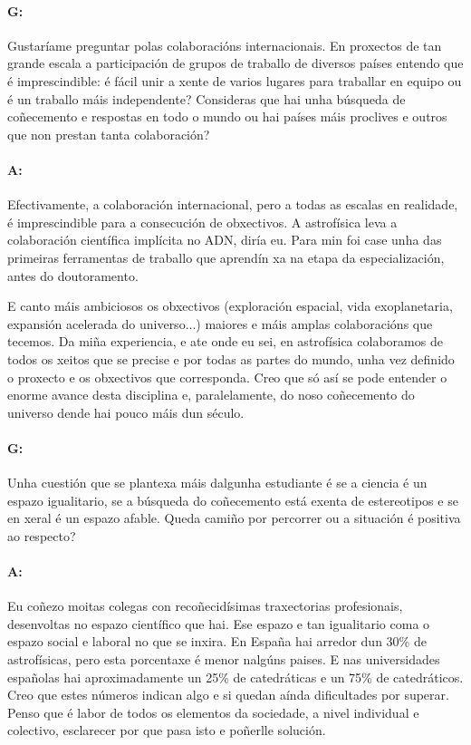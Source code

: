 \begin{refsection}
\begin{multicols}{2}
\paragraph{G:} Gustaríame preguntar polas colaboracións internacionais. En
proxectos de tan grande escala a participación de grupos de traballo de
diversos países entendo que é imprescindible: é fácil unir a xente de varios
lugares para traballar en equipo ou é un traballo máis independente? Consideras
que hai unha búsqueda de coñecemento e respostas en todo o mundo ou hai países
máis proclives e outros que non prestan tanta colaboración?

\paragraph{A:} Efectivamente, a colaboración internacional, pero a todas as
escalas en realidade, é imprescindible para a consecución de obxectivos. A
astrofísica leva a colaboración científica implícita no ADN, diría eu. Para min
foi case unha das primeiras ferramentas de traballo que aprendín xa na etapa da
especialización, antes do doutoramento.

E canto máis ambiciosos os obxectivos (exploración espacial, vida
exoplanetaria, expansión acelerada do universo...) maiores e máis amplas
colaboracións que tecemos. Da miña experiencia, e ate onde eu sei, en
astrofísica colaboramos de todos os xeitos que se precise e por todas as partes
do mundo, unha vez definido o proxecto e os obxectivos que corresponda. Creo
que só así se pode entender o enorme avance desta disciplina e, paralelamente,
do noso coñecemento do universo dende hai pouco máis dun século.

\paragraph{G:} Unha cuestión que se plantexa máis dalgunha estudiante é se a
ciencia é un espazo igualitario, se a búsqueda do coñecemento está exenta de
estereotipos e se en xeral é un espazo afable. Queda camiño por percorrer ou a
situación é positiva ao respecto?

\paragraph{A:} Eu coñezo moitas colegas con recoñecidísimas traxectorias
profesionais, desenvoltas no espazo científico que hai. Ese espazo e tan
igualitario coma o espazo social e laboral no que se inxira. En España hai
arredor dun 30\% de astrofísicas, pero esta porcentaxe é menor nalgúns paises.
E nas universidades españolas hai aproximadamente un 25\% de catedráticas e un
75\% de catedráticos. Creo que estes números indican algo e si quedan aínda
dificultades por superar. Penso que é labor de todos os elementos da sociedade,
a nivel individual e colectivo, esclarecer por que pasa isto e poñerlle
solución.


\end{multicols}
\end{refsection}
